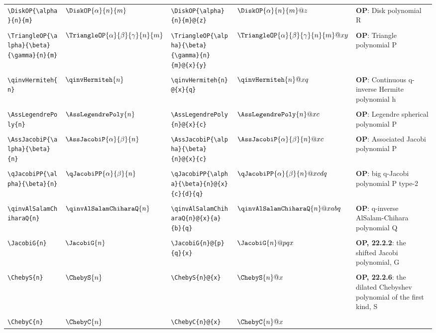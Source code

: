 \begin{supertabular}{ll|ll|p{2in}}
\verb~\DiskOP{\alpha}{n}{m}~ & $\DiskOP{\alpha}{n}{m}$ & 
\verb~\DiskOP{\alpha}{n}{m}@{z}~ & $\DiskOP{\alpha}{n}{m}@{z}$ & 
\textbf{OP}: Disk polynomial R\\*
&&&&\\[-1ex]
\verb~\TriangleOP{\alpha}{\beta}{\gamma}{n}{m}~ & $\TriangleOP{\alpha}{\beta}{\gamma}{n}{m}$ & 
\verb~\TriangleOP{\alpha}{\beta}{\gamma}{n}{m}@{x}{y}~ & $\TriangleOP{\alpha}{\beta}{\gamma}{n}{m}@{x}{y}$ & 
\textbf{OP}: Triangle polynomial P\\*
&&&&\\[-1ex]
\verb~\qinvHermiteh{n}~ & $\qinvHermiteh{n}$ & 
\verb~\qinvHermiteh{n}@{x}{q}~ & $\qinvHermiteh{n}@{x}{q}$ & 
\textbf{OP}: Continuous q-inverse Hermite polynomial h\\*
&&&&\\[-1ex]
\verb~\AssLegendrePoly{n}~ & $\AssLegendrePoly{n}$ & 
\verb~\AssLegendrePoly{n}@{x}{c}~ & $\AssLegendrePoly{n}@{x}{c}$ & 
\textbf{OP}: Legendre spherical polynomial P\\*
&&&&\\[-1ex]
\verb~\AssJacobiP{\alpha}{\beta}{n}~ & $\AssJacobiP{\alpha}{\beta}{n}$ & 
\verb~\AssJacobiP{\alpha}{\beta}{n}@{x}{c}~ & $\AssJacobiP{\alpha}{\beta}{n}@{x}{c}$ & 
\textbf{OP}: Associated Jacobi polynomial P\\*
&&&&\\[-1ex]
\verb~\qJacobiPP{\alpha}{\beta}{n}~ & $\qJacobiPP{\alpha}{\beta}{n}$ & 
\verb~\qJacobiPP{\alpha}{\beta}{n}@{x}{c}{d}{q}~ & $\qJacobiPP{\alpha}{\beta}{n}@{x}{c}{d}{q}$ & 
\textbf{OP}: big q-Jacobi polynomial P type-2\\*
&&&&\\[-1ex]
\verb~\qinvAlSalamChiharaQ{n}~ & $\qinvAlSalamChiharaQ{n}$ & 
\verb~\qinvAlSalamChiharaQ{n}@{x}{a}{b}{q}~ & $\qinvAlSalamChiharaQ{n}@{x}{a}{b}{q}$ & 
\textbf{OP}: q-inverse AlSalam-Chihara polynomial Q\\*
&&&&\\[-1ex]
\verb~\JacobiG{n}~ & $\JacobiG{n}$ & 
\verb~\JacobiG{n}@{p}{q}{x}~ & $\JacobiG{n}@{p}{q}{x}$ & 
\textbf{OP, 22.2.2}: the shifted Jacobi polynomial, G\\*
&&&&\\[-1ex]
\verb~\ChebyS{n}~ & $\ChebyS{n}$ & 
\verb~\ChebyS{n}@{x}~ & $\ChebyS{n}@{x}$ & 
\textbf{OP, 22.2.6}: the dilated Chebyshev polynomial of the first kind, S\\*
&&&&\\[-1ex]
\verb~\ChebyC{n}~ & $\ChebyC{n}$ & 
\verb~\ChebyC{n}@{x}~ & $\ChebyC{n}@{x}$ & 

\end{supertabular}
